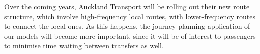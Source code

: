 \documentclass[12pt,a4paper]{article}
\begin{document}
Over the coming years, Auckland Transport will be rolling out their new route structure,
which involve high-frequency local routes, 
with lower-frequency routes to connect the local ones.
As this happens, the journey planning application of our models will become more important,
since it will be of interest to passengers to minimise time waiting between transfers as well.



















\end{document}
